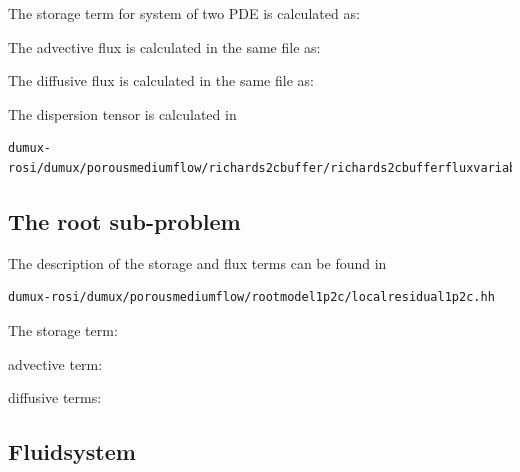 The storage term for system of two PDE is calculated as:
	

The advective flux is calculated in the same file as:
	

The diffusive flux is calculated in the same file as:
	


The dispersion tensor is calculated in 
\begin{lstlisting}
dumux-rosi/dumux/porousmediumflow/richards2cbuffer/richards2cbufferfluxvariables.hh
\end{lstlisting}
	


\subsection*{The root sub-problem}

The description of the storage and flux terms can be found in 

\begin{lstlisting}
dumux-rosi/dumux/porousmediumflow/rootmodel1p2c/localresidual1p2c.hh
\end{lstlisting}
The storage term: 
	

advective term:


diffusive terms:



\subsection*{Fluidsystem}

